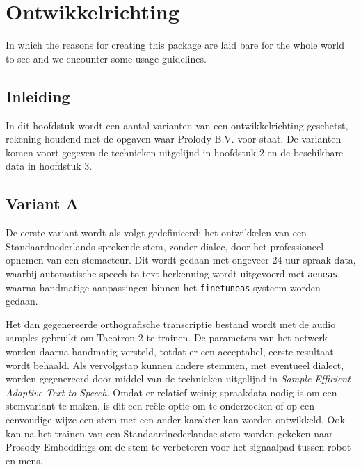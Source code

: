 \chapter{Ontwikkelrichting}

\begin{center}
  \begin{minipage}{0.5\textwidth}
    \begin{small}
      In which the reasons for creating this package are laid bare for the
      whole world to see and we encounter some usage guidelines.
    \end{small}
  \end{minipage}
  \vspace{0.5cm}
\end{center}

\section{Inleiding}
In dit hoofdstuk wordt een aantal varianten van een ontwikkelrichting geschetst, rekening houdend met de opgaven waar Prolody B.V. voor staat. De varianten komen voort gegeven de technieken uitgelijnd in hoofdstuk 2 en de beschikbare data in hoofdstuk 3.

\section{Variant A}
De eerste variant wordt als volgt gedefinieerd: het ontwikkelen van een Standaardnederlands sprekende stem, zonder dialec, door het professioneel opnemen van een stemacteur. Dit wordt gedaan met ongeveer 24 uur spraak data, waarbij automatische speech-to-text herkenning wordt uitgevoerd met \texttt{aeneas}, waarna handmatige aanpassingen binnen het \texttt{finetuneas} systeem worden gedaan.

Het dan gegenereerde orthografische transcriptie bestand wordt met de audio samples gebruikt om Tacotron 2 te trainen. De parameters van het netwerk worden daarna handmatig versteld, totdat er een acceptabel, eerste resultaat wordt behaald. Als vervolgstap kunnen andere stemmen, met eventueel dialect, worden gegenereerd door middel van de technieken uitgelijnd in \textit{Sample Efficient Adaptive Text-to-Speech}. Omdat er relatief weinig spraakdata nodig is om een stemvariant te maken, is dit een reële optie om te onderzoeken of op een eenvoudige wijze een stem met een ander karakter kan worden ontwikkeld. Ook kan na het trainen van een Standaardnederlandse stem worden gekeken naar Prosody Embeddings om de stem te verbeteren voor het signaalpad tussen robot en mens.

